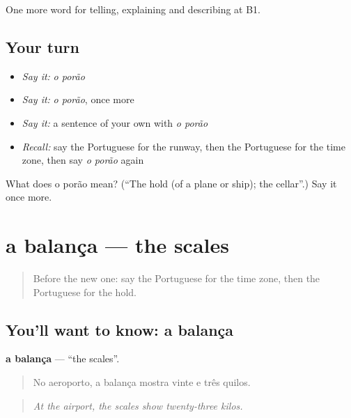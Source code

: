 \begin{grammarlens}[title={What you've built}]
One more word for telling, explaining and describing at B1.
\end{grammarlens}

\subsection*{Your turn}
\begin{itemize}
\raggedright
  \item \emph{Say it:} \emph{o porão}
  \item \emph{Say it:} \emph{o porão}, once more
  \item \emph{Say it:} a sentence of your own with \emph{o porão}
  \item \emph{Recall:} say the Portuguese for the runway, then the Portuguese for the time zone, then say \emph{o porão} again
\end{itemize}

\begin{tcolorbox}[breakable,colback=teal!4,colframe=teal!35!black,title={Before you move on}]
What does o porão mean? (\textquotedblleft{}The hold (of a plane or ship); the cellar\textquotedblright{}.) Say it once more.
\end{tcolorbox}
\section[a balança]{a balança — the scales}

\label{lesson:PT-C422-balanca}



\begin{quote}
Before the new one: say the Portuguese for the time zone, then the Portuguese for the hold.
\end{quote}

\subsection*{You'll want to know: a balança}
\textbf{a balança} — \textquotedblleft{}the scales\textquotedblright{}.

\begin{quote}
No aeroporto, a balança mostra vinte e três quilos.
\end{quote}

\begin{quote}
\emph{At the airport, the scales show twenty-three kilos.}
\end{quote}

